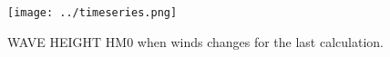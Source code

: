 \begin{figure} [!h]
\centering
\texttt{[image: ../timeseries.png]}
 \caption{WAVE HEIGHT HM0 when winds changes for the last calculation.}
\label{resturningwind}
\end{figure}

